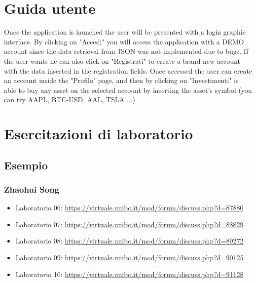 \documentclass[a4paper,12pt]{report}
\begin{document}
\appendix
\chapter{Guida utente}

Once the application is launched the user will be presented with a login graphic interface.
By clicking on "Accedi" you will access the application with a DEMO account since the data retrieval
from JSON was not implemented due to bugs.
If the user wants he can also click on "Registrati" to create a brand new account with the data inserted
in the registration fields.
Once accessed the user can create an account inside the "Profilo" page, and then by clicking on "Investimenti"
is able to buy any asset on the selected account by inserting the asset's symbol (you can try AAPL, BTC-USD, AAL, TSLA ...)

\chapter{Esercitazioni di laboratorio}


\section*{Esempio}

\subsection{Zhaohui Song}

\begin{itemize}
 \item Laboratorio 06: \url{https://virtuale.unibo.it/mod/forum/discuss.php?d=87880}
 \item Laboratorio 07: \url{https://virtuale.unibo.it/mod/forum/discuss.php?d=88829}
 \item Laboratorio 08: \url{https://virtuale.unibo.it/mod/forum/discuss.php?d=89272}
 \item Laboratorio 09: \url{https://virtuale.unibo.it/mod/forum/discuss.php?d=90125}
 \item Laboratorio 10: \url{https://virtuale.unibo.it/mod/forum/discuss.php?d=91128}

\end{itemize}




\end{document}
